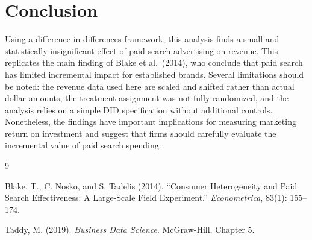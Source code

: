 \documentclass[12pt]{article}
\begin{document}
\section{Conclusion}

Using a difference-in-differences framework, this analysis finds a small and statistically insignificant effect of paid search advertising on revenue. This replicates the main finding of Blake et al.\ (2014), who conclude that paid search has limited incremental impact for established brands. Several limitations should be noted: the revenue data used here are scaled and shifted rather than actual dollar amounts, the treatment assignment was not fully randomized, and the analysis relies on a simple DID specification without additional controls. Nonetheless, the findings have important implications for measuring marketing return on investment and suggest that firms should carefully evaluate the incremental value of paid search spending.

\begin{thebibliography}{9}

Blake, T., C. Nosko, and S. Tadelis (2014).
``Consumer Heterogeneity and Paid Search Effectiveness: A Large-Scale Field Experiment.''
\textit{Econometrica}, 83(1): 155--174.

Taddy, M. (2019).
\textit{Business Data Science}. McGraw-Hill, Chapter 5.

\end{thebibliography}
\end{document}
